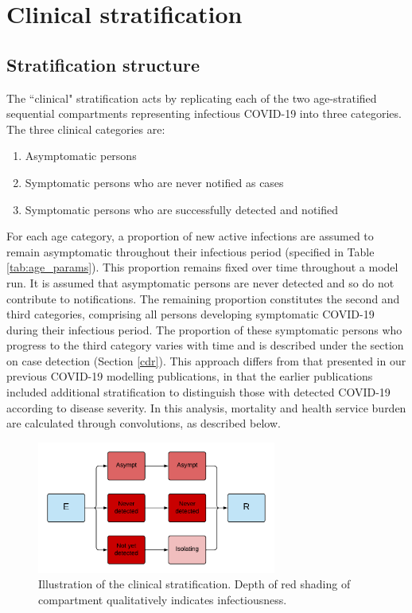 \section{Clinical stratification} \label{clin}
\subsection{Stratification structure}
The ``clinical" stratification acts by replicating each of the two age-stratified sequential compartments representing infectious COVID-19 into three categories.
The three clinical categories are:
\begin{enumerate}
    \item Asymptomatic persons
    \item Symptomatic persons who are never notified as cases
    \item Symptomatic persons who are successfully detected and notified
\end{enumerate}
For each age category, a proportion of new active infections are assumed to remain asymptomatic throughout their infectious period (specified in Table \ref{tab:age_params}).
This proportion remains fixed over time throughout a model run.
It is assumed that asymptomatic persons are never detected and so do not contribute to notifications.
The remaining proportion constitutes the second and third categories, comprising all persons developing symptomatic COVID-19 during their infectious period.
The proportion of these symptomatic persons who progress to the third category varies with time and is described under the section on case detection (Section \ref{cdr}).
This approach differs from that presented in our previous COVID-19 modelling publications,
in that the earlier publications included additional stratification to distinguish those with detected COVID-19 according to disease severity.
In this analysis, mortality and health service burden are calculated through convolutions, as described below.
\begin{figure}[ht]
    \begin{center}
    \includegraphics[width=0.7\textwidth]{../../tex_descriptions/models/sm_sir/stratifications/clinical_strat.pdf}
    \end{center}
    \caption{Illustration of the clinical stratification. \small Depth of red shading of compartment qualitatively indicates infectiousness.}
    \label{fig:seeiir}
\end{figure}
